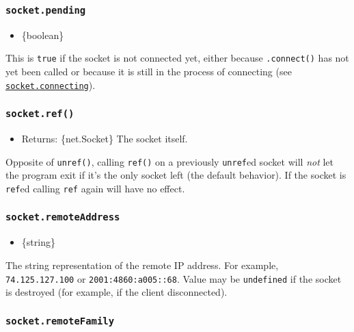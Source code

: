 \subsubsection{\texorpdfstring{\texttt{socket.pending}}{socket.pending}}\label{socket.pending}

\begin{itemize}
\tightlist
\item
  \{boolean\}
\end{itemize}

This is \texttt{true} if the socket is not connected yet, either because
\texttt{.connect()} has not yet been called or because it is still in
the process of connecting (see
\hyperref[socketconnecting]{\texttt{socket.connecting}}).

\subsubsection{\texorpdfstring{\texttt{socket.ref()}}{socket.ref()}}\label{socket.ref}

\begin{itemize}
\tightlist
\item
  Returns: \{net.Socket\} The socket itself.
\end{itemize}

Opposite of \texttt{unref()}, calling \texttt{ref()} on a previously
\texttt{unref}ed socket will \emph{not} let the program exit if it's the
only socket left (the default behavior). If the socket is \texttt{ref}ed
calling \texttt{ref} again will have no effect.

\subsubsection{\texorpdfstring{\texttt{socket.remoteAddress}}{socket.remoteAddress}}\label{socket.remoteaddress}

\begin{itemize}
\tightlist
\item
  \{string\}
\end{itemize}

The string representation of the remote IP address. For example,
\texttt{\textquotesingle{}74.125.127.100\textquotesingle{}} or
\texttt{\textquotesingle{}2001:4860:a005::68\textquotesingle{}}. Value
may be \texttt{undefined} if the socket is destroyed (for example, if
the client disconnected).

\subsubsection{\texorpdfstring{\texttt{socket.remoteFamily}}{socket.remoteFamily}}\label{socket.remotefamily}


